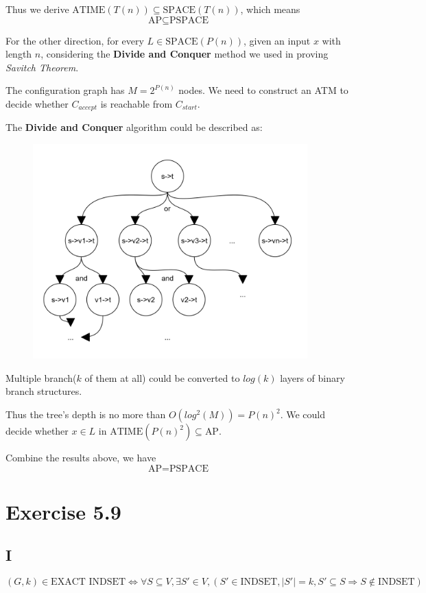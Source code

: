 \documentclass[paper=a4, fontsize=11pt]{scrartcl} %
\numberwithin{equation}{section} %
\numberwithin{figure}{section} %
\numberwithin{table}{section} %
\begin{document}
Thus we derive $\textrm{ATIME}(T(n)) \subseteq \textrm{SPACE}(T(n))$, which means $$\textrm{AP} \subseteq \textrm{PSPACE}$$

For the other direction, for every $L \in \textrm{SPACE}(P(n))$, given an input $x$ with length $n$, considering the {\bf Divide and Conquer} method we used in proving {\it Savitch Theorem}.

The configuration graph has $M = 2^{P(n)}$ nodes. We need to construct an ATM to decide whether $C_{accept}$ is reachable from $C_{start}$.

The {\bf Divide and Conquer} algorithm could be described as:

\begin{figure}[!htb]
\centering
\includegraphics[width=300pt]{savitch.png}
\end{figure}

Multiple branch($k$ of them at all) could be converted to $log(k)$ layers of binary branch structures.

Thus the tree's depth is no more than $O(log^2(M)) = P(n)^2$. We could decide whether $x\in L$ in $\textrm{ATIME}(P(n)^2) \subseteq \textrm{AP}$.

Combine the results above, we have $$\textrm{AP} = \textrm{PSPACE} $$

\section*{Exercise 5.9}
\subsection*{I}
$$(G, k) \in \textrm{EXACT INDSET} \iff \forall S\subseteq V, \exists S'\in V, \left(S' \in \textrm{INDSET}, |S'| = k, S' \subseteq S \Longrightarrow S \not\in \textrm{INDSET}\right)$$
\end{document}
